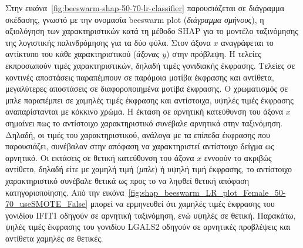 \documentclass[12pt]{report}
\begin{document}
            Στην εικόνα~\ref{fig:beeswarm-shap-50-70-lr-classifier} παρουσιάζεται σε διάγραμμα σκέδασης, γνωστό με την ονομασία beeswarm plot (\emph{διάγραμμα σμήνους}), η αξιολόγηση των χαρακτηριστικών κατά τη μέθοδο SHAP για το μοντέλο ταξινόμησης της λογιστικής παλινδρόμησης για τα δύο φύλα. Στον άξονα $x$ αναγράφεται το αντίκτυπο του κάθε χαρακτηριστικού (\emph{άξονας $y$}) στην πρόβλεψη. Η τελείες εκπροσωπούν τιμές χαρακτηριστικών, δηλαδή τιμές γονιδιακής έκφρασης. Τελείες σε κοντινές αποστάσεις παραπέμπουν σε παρόμοια μοτίβα έκφρασης και αντίθετα, μεγαλύτερες αποστάσεις σε διαφοροποιημένα μοτίβα έκφρασης. Ο χρωματισμός σε μπλε παραπέμπει σε χαμηλές τιμές έκφρασης και αντίστοιχα, υψηλές τιμές έκφρασης αναπαρίστανται με κόκκινο χρώμα. Η έκταση σε αρνητική κατεύθυνση του άξονα $x$ σημαίνει πως το αντίστοιχο χαρακτηριστικό συνέβαλε αρνητικά στην ταξινόμηση. Δηλαδή, οι τιμές του χαρακτηριστικού, ανάλογα με τα επίπεδα έκφρασης που παρουσιάζει, συνέβαλαν στην απόφαση να χαρακτηριστεί αντίστοιχο δείγμα ως αρνητικό. Οι εκτάσεις σε θετική κατεύθυνση του άξονα $x$ εννοούν το ακριβώς αντίθετο, δηλαδή είτε με χαμηλή τιμή (\emph{μπλε}) ή υψηλή τιμή έκφρασης, το αντίστοιχο χαρακτηριστικό συνέβαλε θετικά ως προς το να ληφθεί θετική απόφαση κατηγοριοποίησης. Από την εικόνα~\ref{fig:shap_beeswarm_LR_plot_Female_50-70_useSMOTE_False} μπορεί να ερμηνευθεί ότι χαμηλές τιμές έκφρασης του γονιδίου IFIT1 οδηγούν σε αρνητική ταξινόμηση, ενώ υψηλές σε θετική. Παρακάτω, ψηλές τιμές έκφρασης του γονιδίου LGALS2 οδηγούν σε αρνητικές προβλέψεις και αντίθετα χαμηλές σε θετικές.
\end{document}
